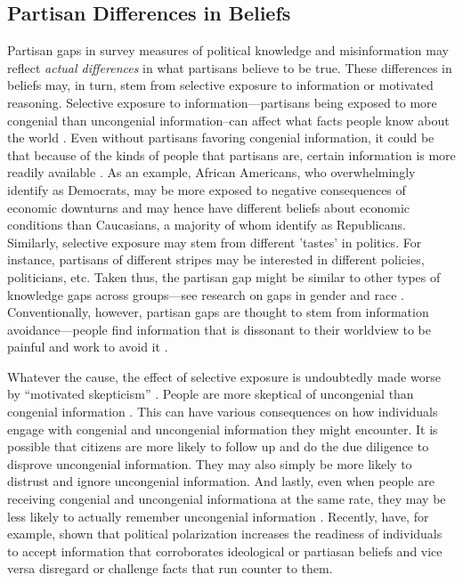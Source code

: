 \documentclass[12pt, letterpaper]{article}
\newcommand{\bgcd} {\color{purple}\em }
\newcommand{\ech}{\color{black}\rm  }    %
\begin{document}
\subsection*{Partisan Differences in Beliefs}
Partisan gaps in survey measures of political knowledge and misinformation may reflect \emph{actual differences} in what partisans believe to be true. These differences in beliefs may, in turn, stem from selective exposure to information or motivated reasoning. Selective exposure to information---partisans being exposed to more congenial than uncongenial information--can affect what facts people know about the world \citep{redlawsk2002hot,stroud_2010}. Even without partisans favoring congenial information, it could be that because of the kinds of people that partisans are, certain information is more readily available \citep[e.g.][]{Zaller1992}. %
As an example, African Americans, who overwhelmingly identify as Democrats, may be more exposed to negative consequences of economic downturns and may hence have different beliefs about economic conditions than Caucasians, a majority of whom identify as Republicans. Similarly, selective exposure may stem from different 'tastes' in politics.
For instance, partisans of different stripes may be interested in different policies, politicians, etc. Taken thus, the partisan gap might be similar to other types of knowledge gaps across groups---see research on gaps in gender \citep{dolan2011women, barabas2014question} and race \citep{abrajano2015reexamining}. Conventionally, however, partisan gaps are thought to stem from information avoidance---people find information that is dissonant to their worldview to be painful and work to avoid it  \citep[e.g.,][]{abelson1959modes,festinger1962theory}.

Whatever the cause, the effect of selective exposure is undoubtedly made worse by ``motivated skepticism'' \citep{taber2006, stroud2008media}. People are more skeptical of uncongenial than congenial information \citep{Zaller1992}. This can have various consequences on how individuals engage with congenial and uncongenial information they might encounter. It is possible that citizens are more likely to follow up and do the due diligence to disprove uncongenial information. They may also simply be more likely to distrust and ignore uncongenial information. And lastly, even when people are receiving congenial and uncongenial informationa at the same rate, they may be less likely to actually remember uncongenial information \citep[see, for example][]{bayes2020and,hill2017learning,flynn2017nature, taber2006}. Recently,  \citet{peterson2021partisan} have, for example, shown that political polarization increases the readiness of individuals to accept information that corroborates ideological or partiasan beliefs and vice versa disregard or challenge facts that run counter to them.
\end{document}
